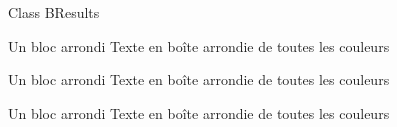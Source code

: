\begin{frame}{Class B}{Results}

	\begin{beamerboxesrounded} [lower=structure, upper=block title, shadow=true] {Un bloc arrondi}
		 Texte en boîte arrondie de toutes les couleurs
	\end{beamerboxesrounded}
	 
	\begin{block} {Un bloc arrondi}
		Texte en boîte arrondie de toutes les couleurs
	\end{block} 
	 
	\vfill
	\begin{beamerboxesrounded}[scheme=clair, shadow=true] {Un bloc arrondi}
		Texte en boîte arrondie de toutes les couleurs
	\end{beamerboxesrounded}
	
\end{frame}
